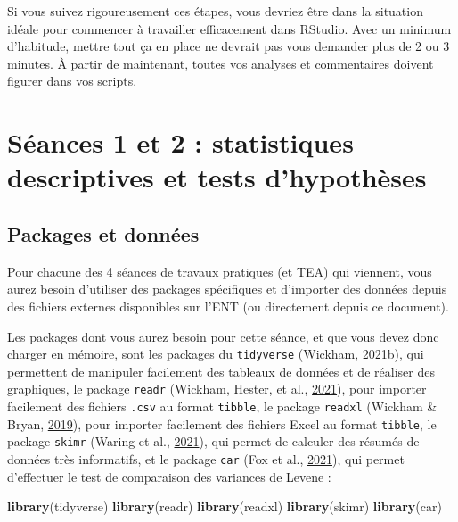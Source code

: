 \documentclass[
  a4paper,
]{article}
\newenvironment{Shaded}{\begin{snugshade}}{\end{snugshade}}
\newcommand{\KeywordTok}[1]{\textcolor[rgb]{0.12,0.11,0.11}{\textbf{#1}}}
\newcommand{\NormalTok}[1]{\textcolor[rgb]{0.12,0.11,0.11}{#1}}
\begin{document}
Si vous suivez rigoureusement ces étapes, vous devriez être dans la situation idéale pour commencer à travailler efficacement dans RStudio. Avec un minimum d'habitude, mettre tout ça en place ne devrait pas vous demander plus de 2 ou 3 minutes. À partir de maintenant, toutes vos analyses et commentaires doivent figurer dans vos scripts.

\hypertarget{seance1}{%
\section{Séances 1 et 2 : statistiques descriptives et tests d'hypothèses}\label{seance1}}

\hypertarget{packages}{%
\subsection{Packages et données}\label{packages}}

Pour chacune des 4 séances de travaux pratiques (et TEA) qui viennent, vous aurez besoin d'utiliser des packages spécifiques et d'importer des données depuis des fichiers externes disponibles sur l'ENT (ou directement depuis ce document).

Les packages dont vous aurez besoin pour cette séance, et que vous devez donc charger en mémoire, sont les packages du \texttt{tidyverse} (Wickham, \protect\hyperlink{ref-R-tidyverse}{2021}\protect\hyperlink{ref-R-tidyverse}{b}), qui permettent de manipuler facilement des tableaux de données et de réaliser des graphiques, le package \texttt{readr} (Wickham, Hester, et al., \protect\hyperlink{ref-R-readr}{2021}), pour importer facilement des fichiers \texttt{.csv} au format \texttt{tibble}, le package \texttt{readxl} (Wickham \& Bryan, \protect\hyperlink{ref-R-readxl}{2019}), pour importer facilement des fichiers Excel au format \texttt{tibble}, le package \texttt{skimr} (Waring et al., \protect\hyperlink{ref-R-skimr}{2021}), qui permet de calculer des résumés de données très informatifs, et le package \texttt{car} (Fox et al., \protect\hyperlink{ref-R-car}{2021}), qui permet d'effectuer le test de comparaison des variances de Levene :

\begin{Shaded}
\begin{Highlighting}[]
\KeywordTok{library}\NormalTok{(tidyverse)}
\KeywordTok{library}\NormalTok{(readr)}
\KeywordTok{library}\NormalTok{(readxl)}
\KeywordTok{library}\NormalTok{(skimr)}
\KeywordTok{library}\NormalTok{(car)}
\end{Highlighting}
\end{Shaded}
\end{document}
